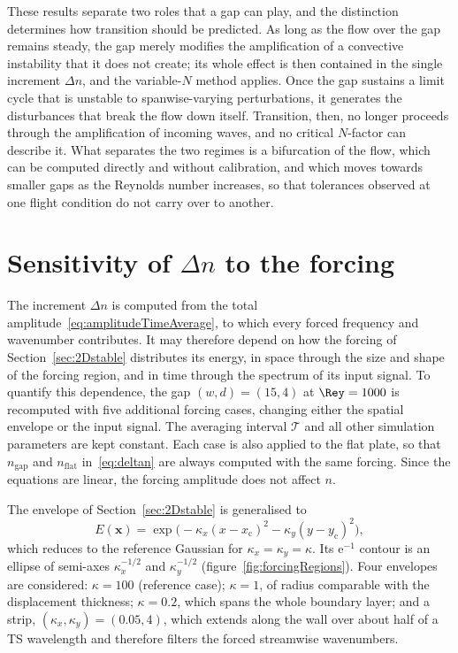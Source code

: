 \documentclass[lineno]{jfm}
\begin{document}
These results separate two roles that a gap can play, and the distinction determines how transition should be predicted. As long as the flow over the gap remains steady, the gap merely modifies the amplification of a convective instability that it does not create; its whole effect is then contained in the single increment $\Delta n$, and the variable-$N$ method \citep{crouchKosoryginNg2006,crouch2021predicting} applies. Once the gap sustains a limit cycle that is unstable to spanwise-varying perturbations, it generates the disturbances that break the flow down itself. Transition, then, no longer proceeds through the amplification of incoming waves, and no critical $N$-factor can describe it. What separates the two regimes is a bifurcation of the flow, which can be computed directly and without calibration, and which moves towards smaller gaps as the Reynolds number increases, so that tolerances observed at one flight condition do not carry over to another.

\appendix
\renewcommand{\theHsection}{appendix.\Alph{section}}
\renewcommand{\theHequation}{\theHsection.\arabic{equation}}
\section{Sensitivity of \texorpdfstring{$\Delta n$}{Delta n} to the forcing}\label{app:forcing}
The increment $\Delta n$ is computed from the total amplitude~\eqref{eq:amplitudeTimeAverage}, to which every forced frequency and wavenumber contributes. It may therefore depend on how the forcing of Section~\ref{sec:2Dstable} distributes its energy, in space through the size and shape of the forcing region, and in time through the spectrum of its input signal. To quantify this dependence, the gap $(w,d)=(15,4)$ at $\Rey=1000$ is recomputed with five additional forcing cases, changing either the spatial envelope or the input signal. The averaging interval $\mathcal{T}$ and all other simulation parameters are kept constant. Each case is also applied to the flat plate, so that $n_\mathrm{gap}$ and $n_\mathrm{flat}$ in~\eqref{eq:deltan} are always computed with the same forcing. Since the equations are linear, the forcing amplitude does not affect $n$.

The envelope of Section~\ref{sec:2Dstable} is generalised to
\begin{equation}\label{eq:forcingEnvelope}
	E(\boldsymbol{x})=\exp\big(-\kappa_x{(x-x_\mathrm{c})}^2-\kappa_y{(y-y_\mathrm{c})}^2\big),
\end{equation}
which reduces to the reference Gaussian for $\kappa_x=\kappa_y=\kappa$. Its $\mathrm{e}^{-1}$ contour is an ellipse of semi-axes $\kappa_x^{-1/2}$ and $\kappa_y^{-1/2}$ (figure~\ref{fig:forcingRegions}). Four envelopes are considered: $\kappa=100$ (reference case); $\kappa=1$, of radius comparable with the displacement thickness; $\kappa=0.2$, which spans the whole boundary layer; and a strip, $(\kappa_x,\kappa_y)=(0.05,4)$, which extends along the wall over about half of a \ac{TS} wavelength and therefore filters the forced streamwise wavenumbers.
\end{document}
